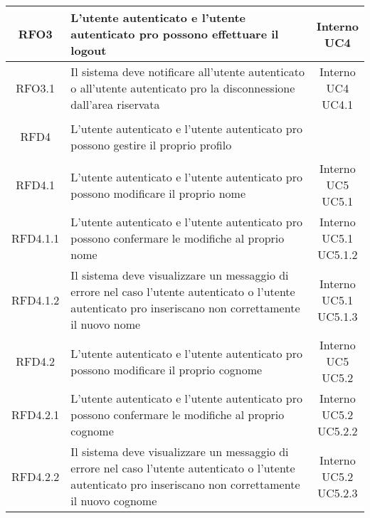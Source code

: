 \begin{longtable}{|c|>{\centering}m{7cm}|c|}
			 \hypertarget{{RFO3}}{{RFO3}} & L’utente autenticato e l’utente autenticato pro possono effettuare il logout & \makecell{Interno\\ UC4 } \\ \hline
			 \hypertarget{{RFO3.1}}{{RFO3.1}} & Il sistema deve notificare all’utente autenticato o all’utente autenticato pro la disconnessione dall’area riservata & \makecell{Interno\\ UC4 \\UC4.1 } \\ \hline
			 \hypertarget{{RFD4}}{{RFD4}} & L’utente autenticato e l’utente autenticato pro possono gestire il proprio profilo & \makecell{Interno } \\ \hline
			 \hypertarget{{RFD4.1}}{{RFD4.1}} & L’utente autenticato e l’utente autenticato pro possono modificare il proprio nome  & \makecell{Interno\\ UC5 \\UC5.1 } \\ \hline
			 \hypertarget{{RFD4.1.1}}{{RFD4.1.1}} & L’utente autenticato e l’utente autenticato pro possono confermare le modifiche al proprio nome & \makecell{Interno\\ UC5.1 \\UC5.1.2 } \\ \hline
			 \hypertarget{{RFD4.1.2}}{{RFD4.1.2}} & Il sistema deve visualizzare un messaggio di errore nel caso l’utente autenticato o l’utente autenticato pro inseriscano non correttamente il nuovo nome & \makecell{Interno\\ UC5.1 \\UC5.1.3 } \\ \hline
			 \hypertarget{{RFD4.2}}{{RFD4.2}} & L’utente autenticato e l’utente autenticato pro possono modificare il proprio cognome  & \makecell{Interno\\ UC5 \\UC5.2 } \\ \hline
			 \hypertarget{{RFD4.2.1}}{{RFD4.2.1}} & L’utente autenticato e l’utente autenticato pro possono confermare le modifiche al proprio cognome & \makecell{Interno\\ UC5.2 \\UC5.2.2 } \\ \hline
			 \hypertarget{{RFD4.2.2}}{{RFD4.2.2}} & Il sistema deve visualizzare un messaggio di errore nel caso l’utente autenticato o l’utente autenticato pro inseriscano non correttamente il nuovo cognome & \makecell{Interno\\ UC5.2 \\UC5.2.3 } \\ \hline

\end{longtable}
